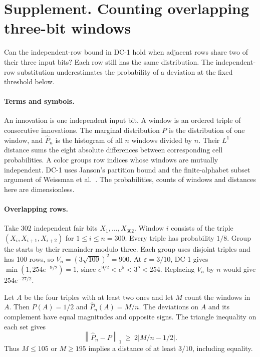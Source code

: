 \documentclass[11pt]{article}
\theoremstyle{definition}
\newcommand{\Phat}{\widehat{P}}
\newcommand{\normone}[1]{\left\lVert #1\right\rVert_1}
\begin{document}
\clearpage
{}
\section*{\leavevmode{} Supplement. Counting overlapping three-bit windows}\label{supp:windows}

Can the independent-row bound in DC-1 hold when adjacent rows share two of their three
input bits? Each row still has the same distribution. The independent-row substitution
underestimates the probability of a deviation at the fixed threshold below.

\paragraph{Terms and symbols.}
An innovation is one independent input bit. A window is an ordered triple of consecutive
innovations. The marginal distribution $P$ is the distribution of one window, and
$\Phat_n$ is the histogram of all $n$ windows divided by $n$. Their $L^1$ distance sums
the eight absolute differences between corresponding cell probabilities. A color groups
row indices whose windows are mutually independent. DC-1 uses Janson's partition bound
and the finite-alphabet subset argument of Weissman et al.~\cite{janson2004,weissman2003}.
The probabilities, counts of windows and distances here are dimensionless.

\paragraph{Overlapping rows.}
Take 302 independent fair bits $X_1,\ldots,X_{302}$. Window $i$ consists of the triple
$(X_i,X_{i+1},X_{i+2})$ for $1\le i\le n=300$. Every triple has probability $1/8$.
Group the starts by their remainder modulo three. Each group uses disjoint triples and
has 100 rows, so $V_n=(3\sqrt{100})^2=900$. At $\varepsilon=3/10$, DC-1 gives
$\min(1,254e^{-9/2})=1$, since $e^{9/2}<e^5<3^5<254$. Replacing $V_n$ by $n$
would give $254e^{-27/2}$.

Let $A$ be the four triples with at least two ones and let $M$ count the windows in
$A$. Then $P(A)=1/2$ and $\Phat_n(A)=M/n$. The deviations on $A$ and its complement
have equal magnitudes and opposite signs. The triangle inequality on each set gives
\[
  \normone{\Phat_n-P}\ \ge\ 2|M/n-1/2|.
\]
Thus $M\le105$ or $M\ge195$ implies a distance of at least $3/10$, including equality.
\end{document}
